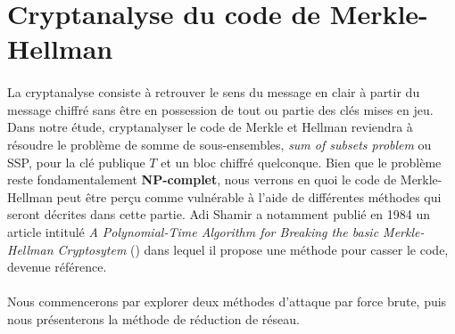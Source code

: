 \documentclass[a4paper,10pt]{article}
\begin{document}
\section{Cryptanalyse du code de Merkle-Hellman}
\paragraph{}La cryptanalyse consiste à retrouver le sens du message en clair à partir du message chiffré sans être en possession de tout ou partie des clés mises en jeu. Dans notre étude, cryptanalyser le code de Merkle et Hellman reviendra à résoudre le problème 
de somme de sous-ensembles, \textit{sum of subsets problem} ou SSP, pour la clé publique $T$ et un bloc chiffré quelconque. Bien que le problème reste fondamentalement \textbf{NP-complet}, nous verrons en quoi le code de Merkle-Hellman peut être perçu comme vulnérable à l'aide de différentes méthodes qui seront décrites dans cette partie. Adi Shamir a notamment publié en 1984 un article intitulé \textit{A Polynomial-Time Algorithm for Breaking the basic Merkle-Hellman Cryptosytem} (\cite{1056964}) dans lequel il propose une méthode pour casser le code, devenue référence. 
\paragraph{}Nous commencerons par explorer deux méthodes d'attaque par force brute, puis nous présenterons la méthode de réduction de réseau. 


% 









\newpage
\appendix





\newpage
\nocite{*}  %


\renewcommand{\refname}{Bibliographie}


\end{document}
